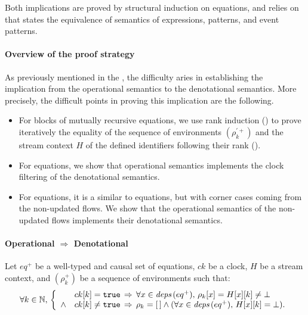 \begin{skippableproof}
    Both implications are proved by structural induction on \GRSync equations, and
    relies on  that states the equivalence of semantics of \GRSync expressions, patterns, and event patterns.

    \paragraph{Overview of the proof strategy}
    As previously mentioned in the , the
    difficulty aries in establishing the implication from the operational semantics to the
    denotational semantics. More precisely, the difficult points in proving this implication are the
    following.
    \begin{itemize}
        \item For blocks of mutually recursive equations, we use rank induction
              () to prove iteratively the
              equality of the sequence of environments $(\rho_k^{\prime+})$ and the stream context
              $H$ of the defined identifiers following their rank ().
        \item For  equations, we show that operational semantics implements the clock
              filtering of the denotational semantics.
        \item For  equations, it is a similar to  equations, but with corner
              cases coming from the non-updated flows. We show that the operational semantics of
              the non-updated flows implements their denotational semantics.
    \end{itemize}


    \paragraph{Operational $\Rightarrow$ Denotational}
    \label{sec:semantics:grsync:theorems:equivalence:eq:proof:op_to_den}
    Let $eq^+$ be a well-typed and causal set of \GRSync equations, $ck$ be a clock, $H$ be a stream
    context, and $(\rho_k^+)$ be a sequence of environments such that:
    \begin{equation*}
        \forall k \in \mathbb{N}, \,
        \left\{
        \begin{array}{ll}
                   & ck[k] = \mathtt{{true}} \, \Rightarrow \,
            \forall x \in {\ensuremath{\textit{deps}\left(eq^+\right)}}, \, \rho_k[x] = H[x][k] \neq \bot               \\
            \wedge & ck[k] \neq \mathtt{{true}} \, \Rightarrow \,
            \rho_k = [\,] \wedge (\forall x \in {\ensuremath{\textit{deps}\left(eq^+\right)}}, \, H[x][k] = \bot). \\
        \end{array}
        \right.
    \end{equation*}


\end{skippableproof}
